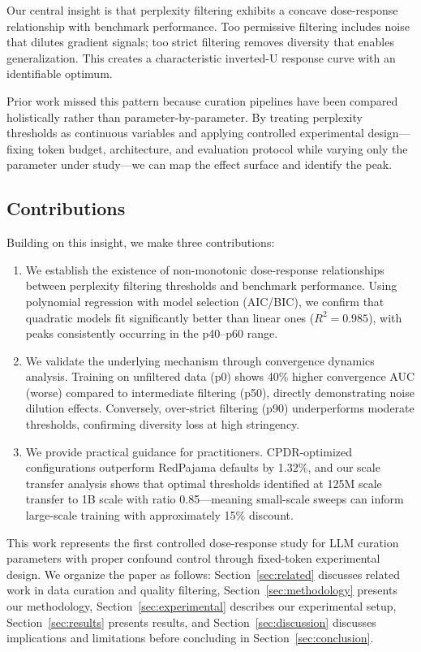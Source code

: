 Our central insight is that perplexity filtering exhibits a concave dose-response relationship with benchmark performance. Too permissive filtering includes noise that dilutes gradient signals; too strict filtering removes diversity that enables generalization. This creates a characteristic inverted-U response curve with an identifiable optimum.

Prior work missed this pattern because curation pipelines have been compared holistically rather than parameter-by-parameter. By treating perplexity thresholds as continuous variables and applying controlled experimental design---fixing token budget, architecture, and evaluation protocol while varying only the parameter under study---we can map the effect surface and identify the peak.

\subsection{Contributions}

Building on this insight, we make three contributions:

\begin{enumerate}
    \item We establish the existence of non-monotonic dose-response relationships between perplexity filtering thresholds and benchmark performance. Using polynomial regression with model selection (AIC/BIC), we confirm that quadratic models fit significantly better than linear ones ($R^2 = 0.985$), with peaks consistently occurring in the p40--p60 range.

    \item We validate the underlying mechanism through convergence dynamics analysis. Training on unfiltered data (p0) shows 40\% higher convergence AUC (worse) compared to intermediate filtering (p50), directly demonstrating noise dilution effects. Conversely, over-strict filtering (p90) underperforms moderate thresholds, confirming diversity loss at high stringency.

    \item We provide practical guidance for practitioners. CPDR-optimized configurations outperform RedPajama defaults by 1.32\%, and our scale transfer analysis shows that optimal thresholds identified at 125M scale transfer to 1B scale with ratio 0.85---meaning small-scale sweeps can inform large-scale training with approximately 15\% discount.
\end{enumerate}

This work represents the first controlled dose-response study for LLM curation parameters with proper confound control through fixed-token experimental design. We organize the paper as follows: Section~\ref{sec:related} discusses related work in data curation and quality filtering, Section~\ref{sec:methodology} presents our methodology, Section~\ref{sec:experimental} describes our experimental setup, Section~\ref{sec:results} presents results, and Section~\ref{sec:discussion} discusses implications and limitations before concluding in Section~\ref{sec:conclusion}.
